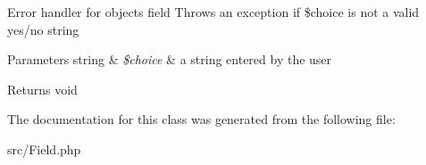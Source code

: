 Error handler for object\textquotesingle{}s field Throws an exception if \$choice is not a valid \textquotesingle{}yes\textquotesingle{}/\textquotesingle{}no\textquotesingle{} string 
\begin{DoxyParams}[1]{Parameters}
string & {\em \$choice} & a string entered by the user \\
\hline
\end{DoxyParams}
\begin{DoxyReturn}{Returns}
void 
\end{DoxyReturn}


The documentation for this class was generated from the following file\+:\begin{DoxyCompactItemize}
\item 
src/Field.\+php\end{DoxyCompactItemize}

